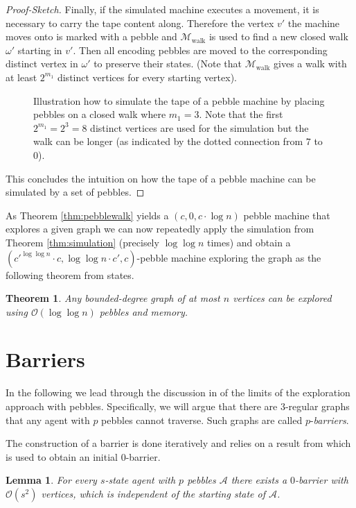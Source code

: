 \documentclass[oneside]{scrartcl}
\newtheorem{thm}{Theorem}
\newtheorem{lem}{Lemma}
\begin{document}
\begin{proof}[Proof-Sketch]
  Finally, if the simulated machine executes a movement, it is necessary to
  carry the tape content along. Therefore the vertex $v'$ the machine moves
  onto is marked with a pebble and $\mathcal{M}_{\text{walk}}$ is used to find
  a new closed walk $\omega'$ starting in $v'$. Then all encoding pebbles are
  moved to the corresponding distinct vertex in $\omega'$ to preserve their
  states. (Note that $\mathcal{M}_{\text{walk}}$ gives a walk with at least
  $2^{m_{1}}$ distinct vertices for every starting vertex).
  \begin{figure}
    \begin{center}
      \resizebox{0.6\textwidth}{!}{}
    \end{center}
    \caption{Illustration how to simulate the tape of a pebble machine by
      placing pebbles on a closed walk where $m_{1} = 3$. Note that the first
      $2^{m_{1}}=2^{3}=8$ distinct vertices are used for the simulation but the
    walk can be longer (as indicated by the dotted connection from $7$ to $0$).}
    \label{fig:tapesim}
  \end{figure}
  This concludes the intuition on how the tape of a pebble machine can be
  simulated by a set of pebbles.
\end{proof}

As Theorem \ref{thm:pebblewalk} yields a $(c,0,c\cdot\log n)$ pebble machine
that explores a given graph we can now repeatedly apply the simulation
from Theorem \ref{thm:simulation} (precisely $\log\log n$ times) and obtain
a $(c'^{\log\log n}\cdot c, \log\log n\cdot c', c)$-pebble machine exploring
the graph as the following theorem from \cite{pebbles} states.
\begin{thm}
  Any bounded-degree graph of at most $n$ vertices can be explored using
  $\mathcal{O}(\log \log n)$ pebbles and memory.
\end{thm}

\section{Barriers}
In the following we lead through the discussion in \cite{pebbles} of the limits
of the exploration approach with pebbles. Specifically, we will argue that
there are 3-regular graphs that any agent with $p$ pebbles cannot traverse.
Such graphs are called $p$-\emph{barriers}.

The construction of a barrier is done iteratively and relies on a result from
\citeauthor{0barrier} \cite{0barrier} which is used to obtain an initial
$0$-barrier.
\begin{lem}
  \label{lem:0bar}
  For every $s$-state agent with $p$ pebbles $\mathcal{A}$ there exists a
  $0$-barrier with $\mathcal{O}(s^{2})$ vertices, which is independent of
  the starting state of $\mathcal{A}$.
\end{lem}
\end{document}
